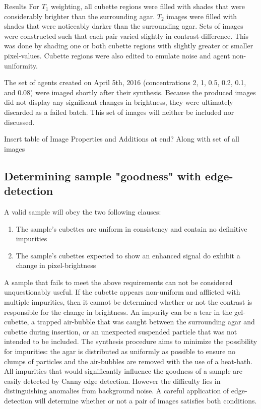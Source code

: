 \documentclass[a4paper,12pt]{article}
\begin{document}
\begin{section}{Results}
For $T_1$ weighting, all cubette regions were filled with shades that were considerably brighter than the surrounding agar. $T_2$ images were filled with shades that were noticeably darker than the surrounding agar. Sets of images were constructed such that each pair varied slightly in contrast-difference. This was done by shading one or both cubette regions with slightly greater or smaller pixel-values. Cubette regions were also edited to emulate noise and agent non-uniformity.

The set of agents created on April 5th, 2016 (concentrations 2, 1, 0.5, 0.2, 0.1, and 0.08) were imaged shortly after their synthesis. Because the produced images did not display any significant changes in brightness, they were ultimately discarded as a failed batch. This set of images will neither be included nor discussed. 

Insert table of Image Properties and Additions at end? Along with set of all images

\subsection{Determining sample "goodness" with edge-detection}

A valid sample will obey the two following clauses: 

\singlespacing
\begin{enumerate}
\item The sample's cubettes are uniform in consistency and contain no definitive impurities
\item The sample's cubettes expected to show an enhanced signal do exhibit a change in pixel-brightness
\end{enumerate}
\doublespacing

A sample that fails to meet the above requirements can not be considered unquestionably useful. If the cubette appears non-uniform and afflicted with multiple impurities, then it cannot be determined whether or not the contrast is responsible for the change in brightness. An impurity can be a tear in the gel-cubette, a trapped air-bubble that was caught between the surrounding agar and cubette during insertion, or an unexpected suspended particle that was not intended to be included. The synthesis procedure aims to minimize the possibility for impurities: the agar is distributed as uniformly as possible to ensure no clumps of particles and the air-bubbles are removed with the use of a heat-bath. All impurities that would significantly influence the goodness of a sample are easily detected by Canny edge detection. However the difficulty lies in distinguishing anomalies from background noise. A careful application of edge-detection will determine whether or not a pair of images satisfies both conditions. 


\end{section}
\end{document}
